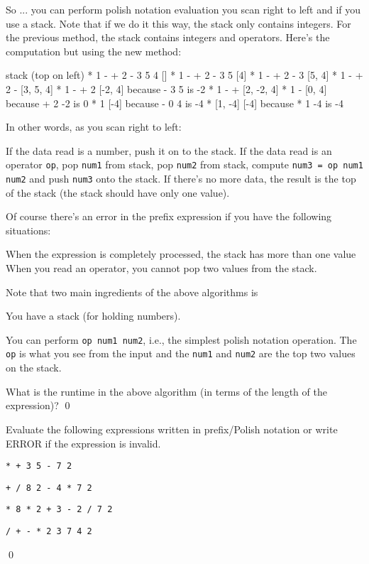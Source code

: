 So ...
you can perform polish notation evaluation
you scan right to left
and if you use a stack.
Note that if we do it this way, the stack only contains integers.
For the previous method, the stack contains integers and operators.
Here's the computation but using the new method:
\begin{console} 
                       stack (top on left)
  * 1 - + 2 - 3 5 4    []
  * 1 - + 2 - 3 5      [4] 
  * 1 - + 2 - 3        [5,  4]
  * 1 - + 2 -          [3,  5, 4]             
  * 1 - + 2            [-2, 4]       because - 3 5 is -2
  * 1 - +              [2, -2, 4]
  * 1 -                [0,  4]       because + 2 -2 is 0
  * 1                  [-4]          because - 0 4  is -4
  *                    [1, -4]
                       [-4]          because * 1 -4 is -4 
\end{console}
In other words, as you scan right to left:
\begin{tightlist}
\li If the data read is a number, push it on to the stack.
\li If the data read is an operator \verb!op!, 
    pop \verb!num1! from stack,
    pop \verb!num2! from stack, compute 
    \verb!num3 = op num1 num2! and push \verb!num3! onto the stack.
\li If there's no more data, the result is the top of the stack
(the stack should have only one value).
\end{tightlist}
Of course there's an error in the prefix expression if you have the
following situations:
\begin{tightlist}
\li When the expression is completely processed, the stack has more than 
one value
\li When you read an operator, you cannot pop two values from the
stack.
\end{tightlist}

Note that two main ingredients of the above algorithms is
\begin{tightlist}
  \item You have a stack (for holding numbers).
  \item You can perform \texttt{op num1 num2}, i.e., the simplest polish notation
  operation. The \texttt{op} is what you see from the input and
  the \texttt{num1} and \texttt{num2} are the top two values on the stack.
\end{tightlist}

\begin{ex}
What is the runtime in the above algorithm
(in terms of the length of the expression)?
\qed
\end{ex}

\begin{ex}
Evaluate the following expressions written in
prefix/Polish notation or write ERROR if the expression
is invalid.
\begin{tightlist}
  \item \texttt{* + 3 5 - 7 2}
  \item \texttt{+ / 8 2 - 4 * 7 2}
  \item \texttt{* 8 * 2 + 3 - 2 / 7 2}
  \item \texttt{/ + - * 2 3 7 4 2}
\end{tightlist}
\qed
\end{ex}


